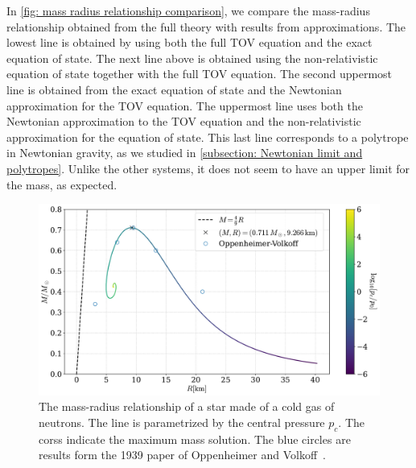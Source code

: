 In \autoref{fig: mass radius relationship comparison}, we compare the mass-radius relationship obtained from the full theory with results from approximations.
The lowest line is obtained by using both the full TOV equation and the exact equation of state.
The next line above is obtained using the non-relativistic equation of state together with the full TOV equation.
The second uppermost line is obtained from the exact equation of state and the Newtonian approximation for the TOV equation.
The uppermost line uses both the Newtonian approximation to the TOV equation and the non-relativistic approximation for the equation of state.
This last line corresponds to a polytrope in Newtonian gravity, as we studied in \autoref{subsection: Newtonian limit and polytropes}.
Unlike the other systems, it does not seem to have an upper limit for the mass, as expected.


\begin{figure}[H]
    \centering
    \includegraphics[width=\textwidth]{../scripts/figurer/mass_radius_neutron.pdf}
    \caption{The mass-radius relationship of a star made of a cold gas of neutrons. The line is parametrized by the central pressure $p_c$. The corss indicate the maximum mass solution. The blue circles are results form the 1939 paper of Oppenheimer and Volkoff~\autocite{oppenheimerMassiveNeutronCores1939}.}
    \label{fig: mass radius relationship fermi gas}
\end{figure}

